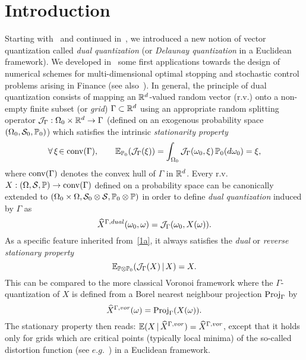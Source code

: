 \section{Introduction}
Starting with~\cite{cdo} and continued in~\cite{dualStat}, we introduced a new notion of vector quantization called {\em
dual quantization} (or  {\em Delaunay quantization}  in a Euclidean framework). We developed in~\cite{dualAppl} some first applications towards the design of numerical schemes for multi-dimensional optimal stopping and stochastic control problems arising in Finance (see also~\cite{BCC}).
In general, the principle of dual quantization consists of mapping an $\mathbb{R}^d$-valued random vector 
(r.v.) onto a non-empty finite subset (or {\em grid}) $\Gamma\subset \mathbb{R}^d$ using an appropriate random
splitting operator ${\cal J}_{\Gamma} : \Omega_0\times \mathbb{R}^d\to \Gamma$ (defined
on an exogenous probability space $(\Omega_0,\mathcal{S}_0, \mathbb{P}_0)$)
which satisfies the intrinsic {\em stationarity property}
\begin{equation}\label{1a}
\forall\, \xi \!\in \conv(\Gamma),\qquad \E_{\Prob_0}({\cal J}_{\Gamma}
(\xi))=\int_{\Omega_0} {\cal J}_{\Gamma} (\omega_0,\xi)
\,\Prob_0(d\omega_0)=\xi,
\end{equation}
where $\operatorname{conv}(\Gamma)$ denotes the convex hull of $\Gamma$ in $\mathbb{R}^d$. Every r.v.  $X:(\Omega,\mathcal{S}, \mathbb{P})\to \operatorname{conv}(\Gamma) $ defined on a probability space   can be  canonically
extended to $(\Omega_0\times\Omega,\mathcal{S}_0\otimes\mathcal{S},
\mathbb{P}_0\otimes\mathbb{P})$ in order to define  {\em dual quantization} induced by $\Gamma$ as
\[
\widehat X^{\Gamma, dual}(\omega_0, \omega) =   {\cal J}_{\Gamma} (\omega_0,X(\omega)).
\]
As a specific feature inherited from~\eqref{1a}, it always satisfies the {\em dual} or {\em reverse stationary property}
 \[ 
 \mathbb{E}_{\mathbb{P}\otimes\mathbb{P}_0}({\cal J}_{\Gamma} (X)\,|\,
X)=X. 
\] 
This 
can be compared to the more  classical Voronoi framework   where the $\Gamma$-quantization of $X$ is defined from a  Borel nearest neighbour projection ${\rm Proj}_{\Gamma}$ by
\[
\widehat X^{\Gamma, vor}( \omega) = {\rm Proj}_{\Gamma}(X(\omega)).
\]
The stationary property then reads: $\displaystyle \mathbb{E}(X\,|\, \widehat X^{\Gamma, vor})=\widehat X^{\Gamma, vor}$, except that it holds 
only for grids which are critical points (typically local minima) of the so-called distortion function (see $e.g.$~\cite{Foundations})
in a Euclidean framework.

